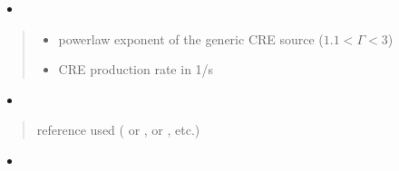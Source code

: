 \documentclass[letterpaper,10pt,english]{sphinxmanual}
\begin{document}
\begin{fulllineitems}
\begin{quote}
\begin{description}
\begin{itemize}
\end{itemize}

\end{description}\end{quote}
\begin{itemize}
\item {} 
\sphinxAtStartPar
{}

\end{itemize}
\begin{quote}\begin{description}
\begin{itemize}
\item {} 
\sphinxAtStartPar
{} \textendash{} power\sphinxhyphen{}law exponent of the generic CRE source (\(1.1 < \Gamma < 3\))

\item {} 
\sphinxAtStartPar
{} \textendash{} CRE production rate in 1/s

\end{itemize}

\end{description}\end{quote}
\begin{itemize}
\item {} 
\sphinxAtStartPar
{}

\end{itemize}
\begin{quote}\begin{description}
\sphinxAtStartPar
{} \textendash{} reference used ( or \sphinxcode{\sphinxupquote{\textquotesingle{}1309.2641\textquotesingle{}}},  or \sphinxcode{\sphinxupquote{\textquotesingle{}1408.0002\textquotesingle{}}}, etc.)

\end{description}\end{quote}
\begin{itemize}
\item {} 
\sphinxAtStartPar
{}


\end{itemize}
\end{fulllineitems}
\end{document}
